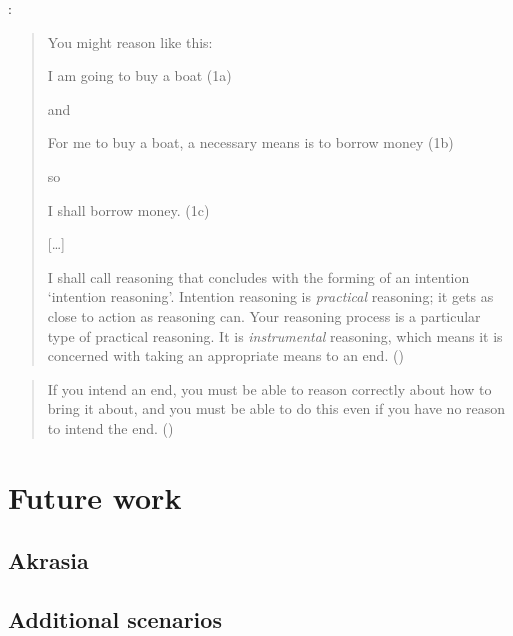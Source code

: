 \documentclass[10pt]{article}
\begin{document}
\citeauthor{Broome:2002aa}:

\begin{quote}
  You might reason like this:

  \mbox{}\quad I am going to buy a boat \hfill (1a)

  and

  \mbox{}\quad For me to buy a boat, a necessary means is to borrow money \hfill (1b)

  so

  \mbox{}\quad I shall borrow money. \hfill (1c)

  \begin{center}
    [\dots]
  \end{center}

  I shall call reasoning that concludes with the forming of an intention `intention reasoning'.
  Intention reasoning is \emph{practical} reasoning; it gets as close to action as reasoning can.
  Your reasoning process is a particular type of practical reasoning.
  It is \emph{instrumental} reasoning, which means it is concerned with taking an appropriate means to an end.\nolinebreak
  \mbox{}\hfill\mbox{(\citeyear[86]{Broome:2002aa})}
\end{quote}

\begin{quote}
  If you intend an end, you must be able to reason correctly about how to bring it about, and you must be able to do this even if you have no reason to intend the end.\nolinebreak
  \mbox{}\hfill\mbox{(\citeyear[96]{Broome:2002aa})}
\end{quote}

\newpage

\section{Future work}
\label{sec:future-work}

\subsection{Akrasia}
\label{sec:akrasia}

\subsection{Additional scenarios}
\label{sec:additional-scenarios}
\end{document}
